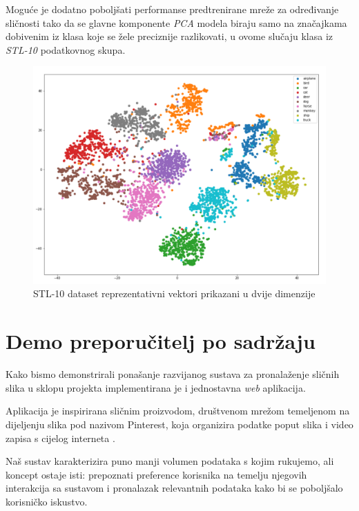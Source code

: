 \documentclass[times, utf8, proizvoljni, numeric]{fer}
\begin{document}
Moguće je dodatno poboljšati performanse predtrenirane mreže za određivanje sličnosti tako da se glavne komponente \textit{PCA} modela biraju samo na značajkama dobivenim iz klasa koje se žele preciznije razlikovati, u ovome slučaju klasa iz \textit{STL-10} podatkovnog skupa.

\begin{figure}[!ht]
	\begin{center}
		\captionsetup{justification=centering}
		\includegraphics[width=1.\textwidth]{./imgs/stl_10_tsne.png}
		\caption{STL-10 dataset reprezentativni vektori prikazani u dvije dimenzije}
		\label{fg:stl_10_tsne}
	\end{center}
\end{figure}

\chapter{Demo preporučitelj po sadržaju}

Kako bismo demonstrirali ponašanje razvijanog sustava za pronalaženje sličnih slika u sklopu projekta implementirana je i jednostavna \textit{web} aplikacija. 

Aplikacija je inspirirana sličnim proizvodom, društvenom mrežom temeljenom na dijeljenju slika pod nazivom Pinterest, koja organizira podatke poput slika i video zapisa s cijelog interneta \cite{wiki-pintrest}. 

Naš sustav karakterizira puno manji volumen podataka s kojim rukujemo, ali koncept ostaje isti: prepoznati preference korisnika na temelju njegovih interakcija sa sustavom i pronalazak relevantnih podataka kako bi se poboljšalo korisničko iskustvo.
\end{document}
